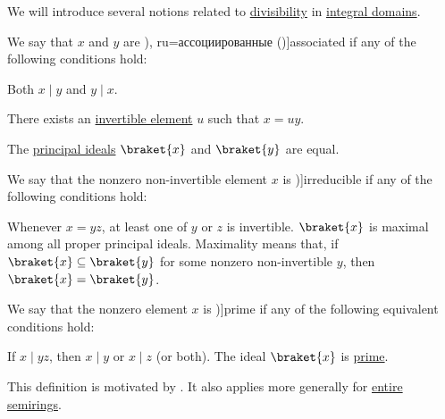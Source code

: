 \begin{definition}\label{def:domain_divisibility}
  We will introduce several notions related to \hyperref[def:divisibility]{divisibility} in \hyperref[def:integral_domain]{integral domains}.

  \begin{thmenum}
     We say that \( x \) and \( y \) are \term[bg=асоциирани (\cite[142]{ГеновМиховскиМоллов1991Алгебра}), ru=ассоциированные (\cite[118]{Винберг2014Алгебра})]{associated} if any of the following conditions hold:
    \begin{thmenum}
       Both \( x \mid y \) and \( y \mid x \).

       There exists an \hyperref[def:divisibility/invertible]{invertible element} \( u \) such that \( x = uy \).

       The \hyperref[def:semiring_ideal/principal]{principal ideals} \( \braket{ x } \) and \( \braket{ y } \) are equal.
    \end{thmenum}

     We say that the nonzero non-invertible element \( x \) is \term[ru=неприводимый (\cite[125]{Тыртышников2017Алгебра})]{irreducible} if any of the following conditions hold:
    \begin{thmenum}
       Whenever \( x = yz \), at least one of \( y \) or \( z \) is invertible.
       \( \braket{ x } \) is maximal among all proper principal ideals. Maximality means that, if \( \braket{ x } \subseteq \braket{ y } \) for some nonzero non-invertible \( y \), then \( \braket{ x } = \braket{ y } \).
    \end{thmenum}

     We say that the nonzero element \( x \) is \term[ru=неприводимый (\cite[125]{Тыртышников2017Алгебра})]{prime} if any of the following equivalent conditions hold:
    \begin{thmenum}
       If \( x \mid yz \), then \( x \mid y \) or \( x \mid z \) (or both).
       The ideal \( \braket{ x } \) is \hyperref[def:semiring_ideal/prime]{prime}.
    \end{thmenum}

    This definition is motivated by . It also applies more generally for \hyperref[def:entire_semiring]{entire semirings}.
  \end{thmenum}
\end{definition}
